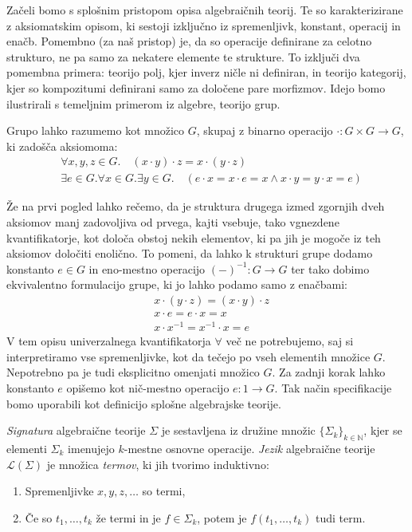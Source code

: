 \documentclass[../kategoricna_logika.tex]{subfiles}
\begin{document}
Začeli bomo s splošnim pristopom opisa algebraičnih teorij.
Te so karakterizirane z aksiomatskim opisom, ki sestoji izključno iz
spremenljivk, konstant, operacij in enačb. Pomembno (za naš pristop) je,
da so operacije definirane za celotno strukturo, ne pa samo za nekatere
elemente te strukture. To izključi dva pomembna primera: teorijo polj,
kjer inverz ničle ni definiran, in teorijo kategorij, kjer so kompozitumi
definirani samo za določene pare morfizmov.
Idejo bomo ilustrirali s temeljnim primerom iz algebre, teorijo grup.
\begin{primer}
  \label{primer:teorija-grup}
  Grupo lahko razumemo kot množico $G$, skupaj z binarno operacijo
  $\cdot : G \times G \to G$, ki zadošča aksiomoma:
  \begin{align}\label{aksiomi-grupe}
    &\forall x,y,z \in G . \quad (x\cdot y) \cdot z = x \cdot (y \cdot z) \\
    &\exists e \in G . \forall x \in G . \exists y \in G . \quad (e \cdot x = x \cdot e = x \wedge x \cdot y = y \cdot x = e)
  \end{align}
\end{primer}
Že na prvi pogled lahko rečemo, da je struktura drugega izmed zgornjih dveh aksiomov
manj zadovoljiva od prvega, kajti vsebuje, tako vgnezdene kvantifikatorje,
kot določa obstoj nekih elementov, ki pa jih je mogoče iz teh aksiomov
določiti enolično. To pomeni, da lahko k strukturi grupe dodamo
konstanto $e \in G$ in eno-mestno operacijo $(-)^{-1} : G \to G$ ter tako
dobimo ekvivalentno formulacijo grupe, ki jo lahko podamo samo z enačbami:
\begin{align*}
  &x \cdot (y \cdot z) = (x \cdot y) \cdot z \\
  &x \cdot e = e \cdot x = x \\
  &x \cdot x^{-1} = x^{-1} \cdot x = e
\end{align*}
V tem opisu univerzalnega kvantifikatorja $\forall$ več ne potrebujemo,
saj si interpretiramo vse spremenljivke, kot da tečejo po vseh elementih množice $G$.
Nepotrebno pa je tudi eksplicitno omenjati množico $G$.
Za zadnji korak lahko konstanto $e$ opišemo kot nič-mestno operacijo $e : 1 \to G$.
Tak način specifikacije bomo uporabili kot definicijo splošne algebrajske teorije.
%
\begin{definicija}
  \emph{Signatura} algebraične teorije $\Sigma$ je sestavljena iz družine
  množic $\lbrace \Sigma_k \rbrace_{k \in \mathbb{N}}$, kjer se elementi $\Sigma_k$
  imenujejo $k$-mestne osnovne operacije.
  \emph{Jezik} algebraične teorije $\mathcal{L}(\Sigma)$ je množica \emph{termov},
  ki jih tvorimo induktivno:
  \begin{enumerate}
  \item Spremenljivke $x,y,z, \ldots$ so termi,
  \item Če so $t_1, \ldots, t_k$ že termi in je $f \in \Sigma_k$, potem
    je $f(t_1,\ldots, t_k)$ tudi term.
  \end{enumerate}
\end{definicija}
\end{document}
